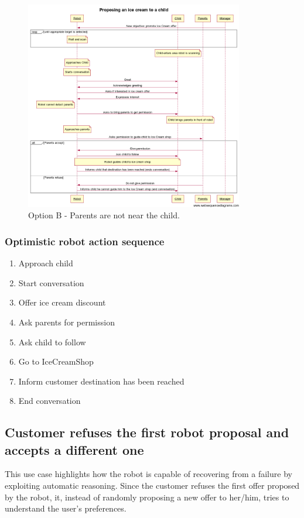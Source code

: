 \begin{figure}[!h]
\includegraphics[width=0.85\textwidth]{iceCreamB}
\protect\caption{Option B - Parents are not near the child.}
\end{figure}



\subsubsection{Optimistic robot action sequence}
\begin{enumerate}
\item Approach child
\item Start conversation
\item Offer ice cream discount
\item Ask parents for permission
\item Ask child to follow
\item Go to IceCreamShop
\item Inform customer destination has been reached
\item End conversation
\end{enumerate}

\newpage

\subsection{Customer refuses the first robot proposal and accepts a different one}

This use case highlights how the robot is capable of
recovering from a failure by exploiting automatic reasoning.
Since the customer refuses the first offer proposed by the robot, it, instead of randomly proposing 
a new offer to her/him, tries to understand the user's preferences.

